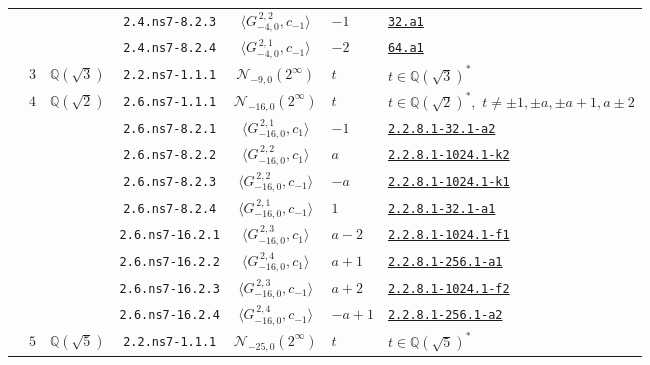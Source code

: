 \documentclass[11pt]{amsart}
\newcommand{\eclabel}[1]{\href{https://www.lmfdb.org/EllipticCurve/Q/#1}{\texttt{#1}}}
\newcommand{\ecnflabel}[2]{\href{https://www.lmfdb.org/EllipticCurve/#1-#2}{\texttt{#1-#2}}}
\theoremstyle{definition}
\newcommand{\Q}{\mathbb Q}
\newcommand{\QQ}{\mathbb Q}
\begin{document}
{\begin{longtable}{|c|c|c|c|c|l|l|}
 & & & \texttt{2.4.ns7-8.2.3} & $\langle G^{\, 2,2}_{-4,0},c_{-1}\rangle$ &  $-1$  &  \eclabel{32.a1} \\ \cline{4-7}   
 & & & \texttt{2.4.ns7-8.2.4} & $\langle G^{\, 2,1}_{-4,0},c_{-1}\rangle$ &   $-2$  &  \eclabel{64.a1} \\ \cline{2-7} 
  & 3 & $\QQ(\sqrt{3})$& \texttt{2.2.ns7-1.1.1} & $\mathcal N_{-9, 0}(2^{\infty})$ & $t$ & $t\in \Q(\sqrt{3})^*$ \\ \cline{2-7}
    & {$4$}  &{$\QQ(\sqrt{2 })$} & \texttt{2.6.ns7-1.1.1} & $\mathcal N_{-16,0}(2^{\infty})$ &   $t$  &  $t\in \Q(\sqrt{2})^*,\,\, t\ne \pm 1,\pm a, \pm a + 1, a \pm 2$\\  \cline{4-7} 
 & & & \texttt{2.6.ns7-8.2.1} & $\langle G^{\, 2,1}_{-16,0},c_{1}\rangle$ &   $-1$  &  \ecnflabel{2.2.8.1}{32.1-a2} \\ \cline{4-7}   
 & & & \texttt{2.6.ns7-8.2.2} & $\langle G^{\, 2,2}_{-16,0},c_{1}\rangle$ &   $a$ &  \ecnflabel{2.2.8.1}{1024.1-k2}  \\ \cline{4-7}   
 & & & \texttt{2.6.ns7-8.2.3} & $\langle G^{\, 2,2}_{-16,0},c_{-1}\rangle$ &  $-a$  & \ecnflabel{2.2.8.1}{1024.1-k1} \\ \cline{4-7}   
 & & & \texttt{2.6.ns7-8.2.4} & $\langle G^{\, 2,1}_{-16,0},c_{-1}\rangle$ &   $1$  &  \ecnflabel{2.2.8.1}{32.1-a1} \\ \cline{4-7} 
 & & & \texttt{2.6.ns7-16.2.1} & $\langle G^{\, 2,3}_{-16,0},c_{1}\rangle$ &   $a-2$  &  \ecnflabel{2.2.8.1}{1024.1-f1} \\ \cline{4-7}   
 & & & \texttt{2.6.ns7-16.2.2} & $\langle G^{\, 2,4}_{-16,0},c_{1}\rangle$ &   $a+1$ &  \ecnflabel{2.2.8.1}{256.1-a1}  \\ \cline{4-7}   
 & & & \texttt{2.6.ns7-16.2.3} & $\langle G^{\, 2,3}_{-16,0},c_{-1}\rangle$ &  $a+2$ & \ecnflabel{2.2.8.1}{1024.1-f2}  \\ \cline{4-7}   
 & & & \texttt{2.6.ns7-16.2.4} & $\langle G^{\, 2,4}_{-16,0},c_{-1}\rangle$ &   $-a+1$  &  \ecnflabel{2.2.8.1}{256.1-a2} \\ \cline{2-7} 
 & $5$ & $\QQ(\sqrt{5})$& \texttt{2.2.ns7-1.1.1} & $\mathcal N_{-25, 0}(2^{\infty})$ & $t$ & $t\in \Q(\sqrt{5})^*$ \\ \hline


\end{longtable}}
\end{document}
